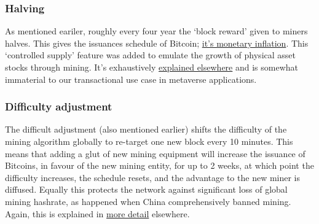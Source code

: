 \subsubsection{Halving}
As mentioned eariler, roughly every four year the `block reward' given to miners halves. This gives the issuances schedule of Bitcoin; \href{http://bashco.github.io/Bitcoin_Monetary_Inflation/}{it's monetary inflation}. This `controlled supply' feature was added to emulate the growth of physical asset stocks through mining. It's exhaustively \href{https://en.bitcoin.it/wiki/Controlled_supply}{explained elsewhere} and is somewhat immaterial to our transactional use case in metaverse applications.
\subsubsection{Difficulty adjustment}
The difficult adjustment (also mentioned earlier) shifts the difficulty of the mining algorithm globally to re-target one new block every 10 minutes. This means that adding a glut of new mining equipment will increase the issuance of Bitcoins, in favour of the new mining entity, for up to 2 weeks, at which point the difficulty increases, the schedule resets, and the advantage to the new miner is diffused. Equally this protects the network against significant loss of global mining hashrate, as happened when China comprehensively banned mining. Again, this is explained in \href{https://en.bitcoin.it/wiki/Difficulty}{more detail} elsewhere.
